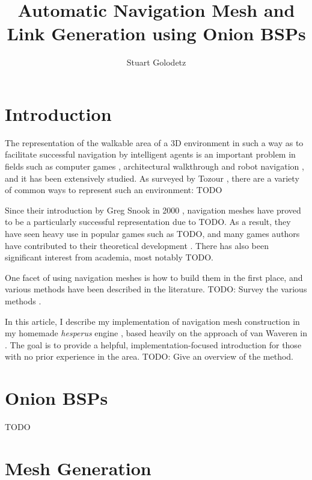 \documentclass[12pt,onecolumn]{article}
\begin{document}
\title{Automatic Navigation Mesh and Link Generation using Onion BSPs}
\author{Stuart Golodetz}
\date{}
\maketitle

\section*{Introduction}

The representation of the walkable area of a 3D environment in such a way as to facilitate successful navigation by intelligent agents is an important problem in fields such as computer games \cite{?}, architectural walkthrough \cite{?} and robot navigation \cite{?}, and it has been extensively studied. As surveyed by Tozour \cite{tozour04}, there are a variety of common ways to represent such an environment: TODO

Since their introduction by Greg Snook in 2000 \cite{snook00}, navigation meshes have proved to be a particularly successful representation due to TODO. As a result, they have seen heavy use in popular games such as TODO, and many games authors have contributed to their theoretical development \cite{?}. There has also been significant interest from academia, most notably TODO.

One facet of using navigation meshes is how to build them in the first place, and various methods have been described in the literature. TODO: Survey the various methods \cite{axelrod08,farnstrom06,hale11,hamm08,kallmann10,mcanlis08,oliva11,pettre05,ratcliff08,tozour02,vantoll11,vanwaveren01,wein05}.

In this article, I describe my implementation of navigation mesh construction in my homemade \emph{hesperus} engine \cite{?}, based heavily on the approach of van Waveren in \cite{?}. The goal is to provide a helpful, implementation-focused introduction for those with no prior experience in the area. TODO: Give an overview of the method.

\section*{Onion BSPs}

TODO

\section*{Mesh Generation}
\end{document}

